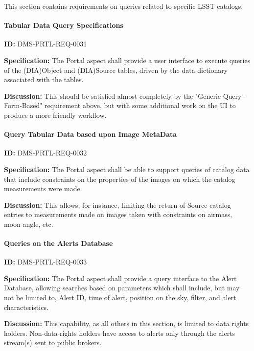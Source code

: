 \documentclass[SE,toc]{lsstdoc}
\begin{document}
This section contains requirements on queries related to specific LSST catalogs.

\paragraph{Tabular Data Query Specifications}\hfill  %

\label{DMS-PRTL-REQ-0031}
\textbf{ID:} DMS-PRTL-REQ-0031

\textbf{Specification:}
The Portal aspect shall provide a user interface to execute queries of the (DIA)Object and (DIA)Source tables, driven by the data dictionary associated with the tables.

\textbf{Discussion:}
This should be satisfied almost completely by the "Generic Query - Form-Based" requirement above, but with some additional work on the UI to produce a more friendly workflow.

\paragraph{Query Tabular Data based upon Image MetaData}\hfill  %

\label{DMS-PRTL-REQ-0032}
\textbf{ID:} DMS-PRTL-REQ-0032

\textbf{Specification:}
The Portal aspect shall be able to support queries of catalog data that include constraints on the properties of the images on which the catalog measurements were made.

\textbf{Discussion:}
This allows, for instance, limiting the return of Source catalog entries to measurements made on images taken with constraints on airmass, moon angle, etc.

\paragraph{Queries on the Alerts Database}\hfill  %

\label{DMS-PRTL-REQ-0033}
\textbf{ID:} DMS-PRTL-REQ-0033

\textbf{Specification:}
The Portal aspect shall provide a query interface to the Alert Database, allowing searches based on parameters which shall include, but may not be limited to, Alert ID, time of alert, position on the sky, filter, and alert characteristics.

\textbf{Discussion:}
This capability, as all others in this section, is limited to data rights holders.  Non-data-rights holders have access to alerts only through the alerts stream(s) sent to public brokers.
\end{document}
